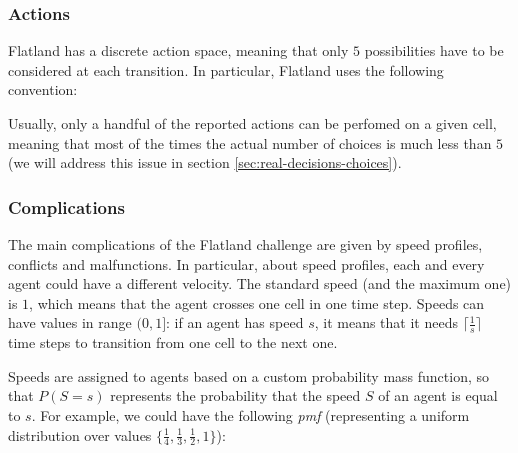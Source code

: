 \documentclass[a4paper,10pt]{report}
\renewcommand{\texttt}[1]{%
  \begingroup
  \ttfamily
  \begingroup\lccode`~=`.\lowercase{\endgroup\def~}{.\discretionary{}{}{}}%
  \catcode`/=\active\catcode`[=\active\catcode`.=\active
  \scantokens{#1\noexpand}%
  \endgroup
}
\begin{document}
\subsubsection*{Actions}
Flatland has a discrete action space, meaning that only $5$ possibilities have to be considered at each transition. In particular, Flatland uses the following convention:

Usually, only a handful of the reported actions can be perfomed on a given cell, meaning that most of the times the actual number of choices is much less than $5$ (we will address this issue in section \ref{sec:real-decisions-choices}).

\subsubsection*{Complications}
The main complications of the Flatland challenge are given by speed profiles, conflicts and malfunctions. In particular, about speed profiles, each and every agent could have a different velocity. The standard speed (and the maximum one) is $1$, which means that the agent crosses one cell in one time step. Speeds can have values in range $(0, 1]$: if an agent has speed $s$, it means that it needs $\lceil\frac{1}{s}\rceil$ time steps to transition from one cell to the next one.

Speeds are assigned to agents based on a custom probability mass function, so that $P(S=s)$ represents the probability that the speed $S$ of an agent is equal to $s$. For example, we could have the following \textit{pmf} (representing a uniform distribution over values $\{\frac{1}{4}, \frac{1}{3}, \frac{1}{2}, 1\}$):
\end{document}
